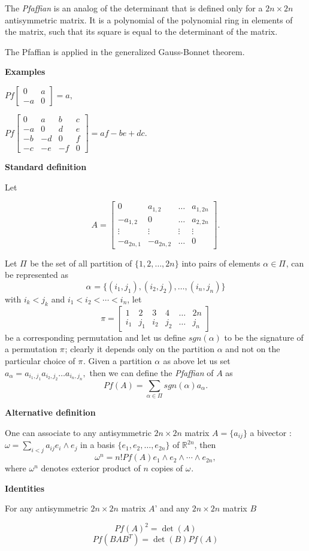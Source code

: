 \documentclass[12pt]{article}
\begin{document}
The {\em Pfaffian} is an analog of the determinant that is defined only for a $2n\times 2n$ antisymmetric matrix. It is a polynomial of the polynomial ring in elements of the matrix, such that its square is equal to the determinant of the matrix. 

The Pfaffian is applied in the generalized Gauss-Bonnet theorem.

{\bf Examples}

$Pf\begin{bmatrix} 0 & a \\ -a & 0 \end{bmatrix}=a,$

$Pf\begin{bmatrix} 0 & a & b & c \\ -a & 0 & d & e \\ -b & -d & 0& f \\-c & -e & -f & 0 \end{bmatrix}=af-be+dc.$

{\bf Standard definition}

Let 

$$A=\begin{bmatrix} 0 & a_{1,2} & \ldots & a_{1,2n} \\ -a_{1,2} & 0 & \ldots & a_{2,2n} \\ \vdots & \vdots & \vdots & \vdots \\-a_{2n,1} & -a_{2n,2} & \ldots & 0 \end{bmatrix}.$$

Let $\Pi^{}_{}$ be the set of all partition of $\{1,2, \ldots ,2n\}$ into pairs of elements $\alpha\in \Pi^{}_{}$, can be represented as 
$$\alpha^{}_{}=\{(i_1,j_1),(i_2,j_2), \ldots ,(i_n,j_n)\} $$ 
with $i_k<j_k$ and $i_1 < i_2 < \cdots < i_n$, let
$$\pi=\begin{bmatrix} 1 & 2 & 3 & 4 & \ldots & 2n \\ i_1 & j_1 & i_2 & j_2 & \ldots & j_{n} \end{bmatrix}$$ 
be a corresponding permutation and let us define 
$sgn(\alpha)$ to be the signature of a permutation $\pi^{}_{}$; clearly it depends only on the partition $\alpha$ and not on the particular choice of $\pi^{}_{}$.
Given a partition $\alpha^{}_{}$ as above let us set
$a_\alpha =a_{i_1,j_1}a_{i_2,j_2} \ldots a_{i_n,j_n},$
then we can define the \emph{Pfaffian} of $A$ as 
$$Pf(A)=\sum_{\alpha\in \Pi} sgn(\alpha)a_\alpha.$$

{\bf Alternative definition}

One can associate to any antisymmetric $2n\times 2n$ matrix $A=\{a_{ij}\}$ 
a bivector 
:$\omega=\sum_{i<j} a_{ij} e_i\wedge e_j$ 
in a basis
$\{e_1,e_2, \ldots ,e_{2n}\}$ of $\mathbb{R}^{2n}$, then 
$$\omega^n= n!Pf(A)e_1\wedge e_2\wedge \cdots \wedge e_{2n},$$
where $\omega^n_{}$ denotes exterior product of $n$ copies of $\omega^{}_{}$.

{\bf Identities}

For any antisymmetric $2n\times 2n$ matrix $A$' and any $2n\times 2n$ matrix $B$

$$Pf(A)^2 = \det(A)$$
$$Pf(BAB^T)= \det(B)Pf(A)$$
\end{document}
